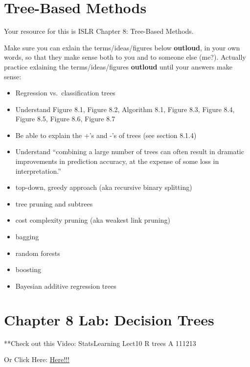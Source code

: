 \documentclass[
]{book}
\providecommand{\tightlist}{%
  \setlength{\itemsep}{0pt}\setlength{\parskip}{0pt}}
\begin{document}
\hypertarget{tree-based-methods}{%
\chapter{Tree-Based Methods}\label{tree-based-methods}}

Your resource for this is ISLR Chapter 8: Tree-Based Methods.

Make sure you can exlain the terms/ideas/figures below \textbf{outloud}, in your own words, so that they make sense both to you and to someone else (me?). Actually practice exlaining the terms/ideas/figures \textbf{outloud} until your answers make sense:

\begin{itemize}
\tightlist
\item
  Regression vs.~classification trees
\item
  Understand Figure 8.1, Figure 8.2, Algorithm 8.1, Figure 8.3, Figure 8.4, Figure 8.5, Figure 8.6, Figure 8.7
\item
  Be able to explain the +'s and -'s of trees (see section 8.1.4)
\item
  Understand ``combining a large number of trees
  can often result in dramatic improvements in prediction accuracy, at the expense of some loss in interpretation.''
\item
  top-down, greedy approach (aka recursive binary splitting)
\item
  tree pruning and subtrees
\item
  cost complexity pruning (aka weakest link pruning)
\item
  bagging
\item
  random forests
\item
  boosting
\item
  Bayesian additive regression trees
\end{itemize}

\hypertarget{chapter-8-lab-decision-trees}{%
\chapter{Chapter 8 Lab: Decision Trees}\label{chapter-8-lab-decision-trees}}

**Check out this Video: StatsLearning Lect10 R trees A 111213

Or Click Here: \href{https://www.youtube.com/watch?v=YPz2J5lHeVM\&list=PLAOUn-KLSAVOqj5TG8E1HTb8Txwxe6OtV\&index=6}{Here!!!}
\end{document}

